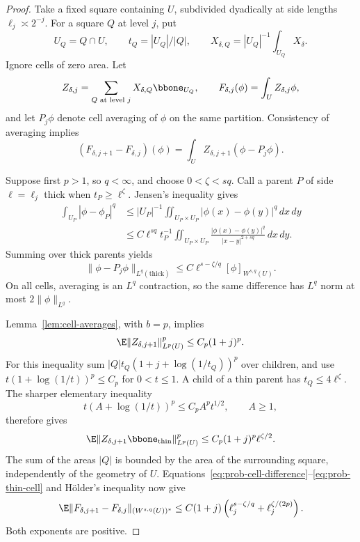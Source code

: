 \begin{proof}
Take a fixed square containing \(U\), subdivided dyadically at side
lengths \(\ell_j\asymp2^{-j}\). For a square \(Q\) at level \(j\), put
\[
 U_Q=Q\cap U,\qquad t_Q=|U_Q|/|Q|,\qquad
 X_{\delta,Q}=|U_Q|^{-1}\int_{U_Q}X_\delta.
\]
Ignore cells of zero area. Let
\[
 Z_{\delta,j}=\sum_{Q\text{ at level }j}
                   X_{\delta,Q}\bbone_{U_Q},\qquad
 F_{\delta,j}(\phi)=\int_U Z_{\delta,j}\phi,
\]
and let \(P_j\phi\) denote cell averaging of \(\phi\) on the same
partition. Consistency of averaging implies
\begin{equation}\label{eq:prob-cell-difference}
 (F_{\delta,j+1}-F_{\delta,j})(\phi)
     =\int_U Z_{\delta,j+1}(\phi-P_j\phi).
\end{equation}

Suppose first \(p>1\), so \(q<\infty\), and choose
\(0<\zeta<sq\). Call a parent \(P\) of side \(\ell=\ell_j\) thick
when \(t_P\ge\ell^\zeta\). Jensen's inequality gives
\begin{align*}
 \int_{U_P}|\phi-\phi_P|^q
 &\le |U_P|^{-1}
            \iint_{U_P\times U_P}|\phi(x)-\phi(y)|^q\,dx\,dy\\
 &\le C\ell^{sq}t_P^{-1}
       \iint_{U_P\times U_P}
          \frac{|\phi(x)-\phi(y)|^q}{|x-y|^{2+sq}}\,dx\,dy.
\end{align*}
Summing over thick parents yields
\begin{equation}\label{eq:prob-thick-cell}
 \|\phi-P_j\phi\|_{L^q(\mathrm{thick})}
        \le C\ell^{s-\zeta/q}[\phi]_{W^{s,q}(U)}.
\end{equation}
On all cells, averaging is an \(L^q\) contraction, so the same difference
has \(L^q\) norm at most \(2\|\phi\|_{L^q}\).

Lemma~\ref{lem:cell-averages}, with \(b=p\), implies
\[
 \E\|Z_{\delta,j+1}\|_{L^p(U)}^p\le C_p(1+j)^p.
\]
For this inequality sum
\(|Q|t_Q(1+j+\log(1/t_Q))^p\) over children, and use
\(t(1+\log(1/t))^p\le C_p\) for \(0<t\le1\).
A child of a thin parent has \(t_Q\le4\ell^\zeta\).
The sharper elementary inequality
\[
 t(A+\log(1/t))^p\le C_p A^p t^{1/2},\qquad A\ge1,
\]
therefore gives
\begin{equation}\label{eq:prob-thin-cell}
 \E\|Z_{\delta,j+1}\bbone_{\mathrm{thin}}\|_{L^p(U)}^p
       \le C_p(1+j)^p\ell^{\zeta/2}.
\end{equation}
The sum of the areas \(|Q|\) is bounded by the area of the surrounding
square, independently of the geometry of \(U\).
Equations~\eqref{eq:prob-cell-difference}--\eqref{eq:prob-thin-cell}
and Hölder's inequality now give
\begin{equation}\label{eq:prob-dual-tail-step}
 \E\|F_{\delta,j+1}-F_{\delta,j}\|_{(W^{s,q}(U))^*}
 \le C(1+j)
       \left(\ell_j^{s-\zeta/q}+\ell_j^{\zeta/(2p)}\right).
\end{equation}
Both exponents are positive.


\end{proof}
